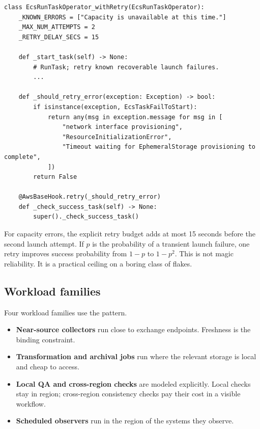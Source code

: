 \documentclass[11pt, reqno]{amsart}
\begin{document}
\begin{lstlisting}[style=python,caption={Sanitized bounded reliability semantics for ECS/Fargate launch and post-launch provisioning failures.},label={lst:retry}]
class EcsRunTaskOperator_withRetry(EcsRunTaskOperator):
    _KNOWN_ERRORS = ["Capacity is unavailable at this time."]
    _MAX_NUM_ATTEMPTS = 2
    _RETRY_DELAY_SECS = 15

    def _start_task(self) -> None:
        # RunTask; retry known recoverable launch failures.
        ...

    def _should_retry_error(exception: Exception) -> bool:
        if isinstance(exception, EcsTaskFailToStart):
            return any(msg in exception.message for msg in [
                "network interface provisioning",
                "ResourceInitializationError",
                "Timeout waiting for EphemeralStorage provisioning to complete",
            ])
        return False

    @AwsBaseHook.retry(_should_retry_error)
    def _check_success_task(self) -> None:
        super()._check_success_task()
\end{lstlisting}

For capacity errors, the explicit retry budget adds at most 15 seconds before the second launch attempt. If $p$ is the probability of a transient launch failure, one retry improves success probability from $1-p$ to $1-p^2$. This is not magic reliability. It is a practical ceiling on a boring class of flakes.

\subsection{Workload families}

Four workload families use the pattern.
\begin{itemize}
  \item \textbf{Near-source collectors} run close to exchange endpoints. Freshness is the binding constraint.
  \item \textbf{Transformation and archival jobs} run where the relevant storage is local and cheap to access.
  \item \textbf{Local QA and cross-region checks} are modeled explicitly. Local checks stay in region; cross-region consistency checks pay their cost in a visible workflow.
  \item \textbf{Scheduled observers} run in the region of the systems they observe.
\end{itemize}
\end{document}
